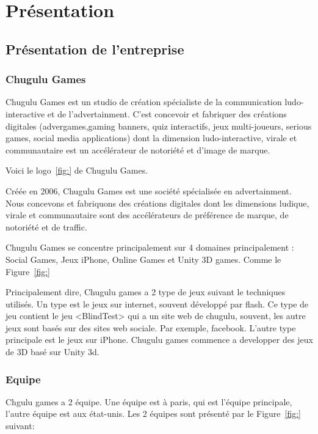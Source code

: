 \chapter{Présentation} %

\section{Présentation de l'entreprise} %

\subsection{Chugulu Games} %

Chugulu Games est un studio de création spécialiste de la communication ludo-interactive et de l'advertainment. C'est concevoir et fabriquer des créations digitales (advergames,gaming banners, quiz interactifs, jeux multi-joueurs, serious games, social media applications) dont la dimension ludo-interactive, virale et communautaire est un accélérateur de notoriété et d'image de marque.

Voici le logo~\ref{fig:} de Chugulu Games.

Créée en 2006, Chugulu Games est une société spécialisée en advertainment. Nous concevons et fabriquons des créations digitales dont les dimensions ludique, virale et communautaire sont des accélérateurs de préférence de marque, de notoriété et de traffic.

Chugulu Games se concentre principalement sur 4 domaines principalement : Social Games, Jeux iPhone, Online Games et Unity 3D games. Comme le Figure~\ref{fig:} 

Principalement dire, Chugulu games a 2 type de jeux suivant le techniques utilisés. Un type est le jeux sur internet, souvent développé par flash. Ce type de jeu contient le jeu <BlindTest> qui a un site web de chugulu, souvent, les autre jeux sont basés sur des sites web sociale. Par exemple, facebook. L'autre type principale est le jeux sur iPhone. Chugulu games commence a developper des jeux de 3D basé sur Unity 3d. 


\subsection{Equipe} %
\label{sub:subsection_name}

Chgulu games a 2 équipe. Une équipe est à paris, qui est l'équipe principale, l'autre équipe est aux état-unis. Les 2 équipes sont présenté par le Figure~\ref{fig:} suivant:

